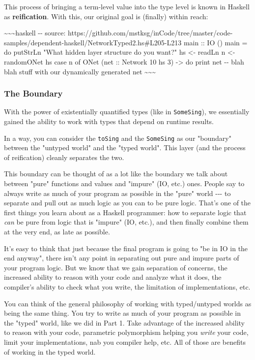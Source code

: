 \documentclass[]{article}
\begin{document}
This process of bringing a term-level value into the type level is known in
Haskell as \textbf{reification}. With this, our original goal is (finally)
within reach:

\textasciitilde{}\textasciitilde{}\textasciitilde{}haskell -\/- source:
https://github.com/mstksg/inCode/tree/master/code-samples/dependent-haskell/NetworkTyped2.hs\#L205-L213
main :: IO () main = do putStrLn "What hidden layer structure do you want?" hs
\textless{}- readLn n \textless{}- randomONet hs case n of ONet (net :: Network
10 hs 3) -\textgreater{} do print net -\/- blah blah stuff with our dynamically
generated net \textasciitilde{}\textasciitilde{}\textasciitilde{}

\subsubsection{The Boundary}

With the power of existentially quantified types (like in \texttt{SomeSing}), we
essentially gained the ability to work with types that depend on runtime
results.

In a way, you can consider the \texttt{toSing} and the \texttt{SomeSing} as our
"boundary" between the "untyped world" and the "typed world". This layer (and
the process of reification) cleanly separates the two.

This boundary can be thought of as a lot like the boundary we talk about between
"pure" functions and values and "impure" (IO, etc.) ones. People say to always
write as much of your program as possible in the "pure" world -\/-\/- to
separate and pull out as much logic as you can to be pure logic. That's one of
the first things you learn about as a Haskell programmer: how to separate logic
that \emph{can} be pure from logic that is "impure" (IO, etc.), and then finally
combine them at the very end, as late as possible.

It's easy to think that just because the final program is going to "be in IO in
the end anyway", there isn't any point in separating out pure and impure parts
of your program logic. But we know that we gain separation of concerns, the
increased ability to reason with your code and analyze what it does, the
compiler's ability to check what you write, the limitation of implementations,
etc.

You can think of the general philosophy of working with typed/untyped worlds as
being the same thing. You try to write as much of your program as possible in
the "typed" world, like we did in Part 1. Take advantage of the increased
ability to reason with your code, parametric polymorphism helping you
\emph{write} your code, limit your implementations, nab you compiler help, etc.
All of those are benefits of working in the typed world.
\end{document}
